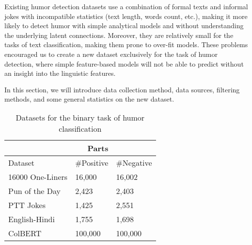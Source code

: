 \documentclass{article}
\begin{document}
Existing humor detection datasets use a combination of formal texts and informal jokes with incompatible statistics (text length, words count, etc.), making it more likely to detect humor with simple analytical models and without understanding the underlying latent connections. Moreover, they are relatively small for the tasks of text classification, making them prone to over-fit models. These problems encouraged us to create a new dataset exclusively for the task of humor detection, where simple feature-based models will not be able to predict without an insight into the linguistic features.

In this section, we will introduce data collection method, data sources, filtering methods, and some general statistics on the new dataset.



\begin{table}
  \caption{Datasets for the binary task of humor classification}
  \label{table-1}
  \centering
  \begin{tabular}{l|ll}
    \hline
    \multicolumn{2}{r}{Parts}                   \\ \hline
     Dataset     &   \#Positive  &  \#Negative \\ \hline
    16000 One-Liners \cite{mihalcea2005making} & 16,000   &	16,002     \\
    Pun of the Day \cite{yang2015humor}     & 2,423  &	2,403      \\
    PTT Jokes \cite{chen2018humor}     &     1,425	&   2,551  \\
    English-Hindi \cite{khandelwal2018humor}     & 1,755	&   1,698  \\ \hline
    ColBERT     &       100,000	&   100,000  \\ \hline
  \end{tabular}
\end{table}
\end{document}
